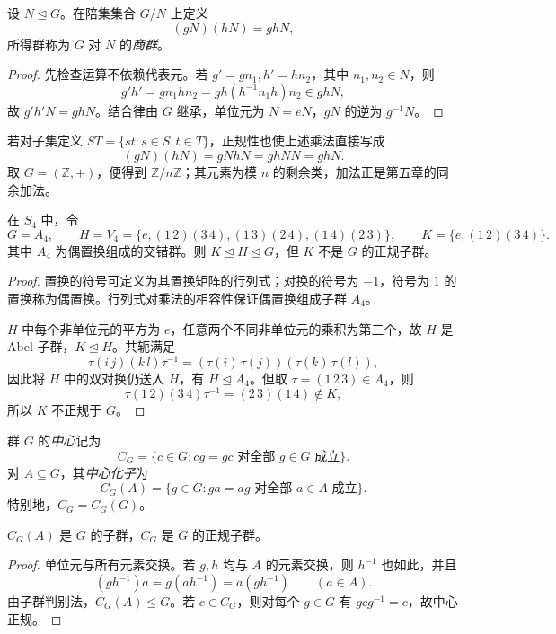 \documentclass[lang=cn,a4paper,fontset=none,zihao=false,10pt,openany,twoside]{beautybook}
\numberwithin{algorithm}{chapter}
\begin{document}
\begin{definition}[商群]
设 $N\trianglelefteq G$。在陪集集合 $G/N$ 上定义
\[
 (gN)(hN)=ghN,
\]
所得群称为 $G$ 对 $N$ 的\emph{商群}。
\end{definition}
\begin{proof}
先检查运算不依赖代表元。若 $g'=gn_1,h'=hn_2$，其中 $n_1,n_2\in N$，则
\[
 g'h'=gn_1hn_2=gh(h^{-1}n_1h)n_2\in ghN,
\]
故 $g'h'N=ghN$。结合律由 $G$ 继承，单位元为 $N=eN$，$gN$ 的逆为 $g^{-1}N$。
\end{proof}
若对子集定义 $ST=\{st:s\in S,t\in T\}$，正规性也使上述乘法直接写成
\[
 (gN)(hN)=gNhN=ghNN=ghN.
\]
取 $G=(\mathbb Z,+)$，便得到 $\mathbb Z/n\mathbb Z$；其元素为模 $n$ 的剩余类，加法正是第五章的同余加法。

\begin{example}[正规性没有传递性]
在 $S_4$ 中，令
\[
 G=A_4,\qquad
 H=V_4=\{e,(1\,2)(3\,4),(1\,3)(2\,4),(1\,4)(2\,3)\},
 \qquad K=\{e,(1\,2)(3\,4)\}.
\]
其中 $A_4$ 为偶置换组成的交错群。则 $K\trianglelefteq H\trianglelefteq G$，但 $K$ 不是 $G$ 的正规子群。
\end{example}
\begin{proof}
置换的符号可定义为其置换矩阵的行列式；对换的符号为 $-1$，符号为 $1$ 的置换称为偶置换。行列式对乘法的相容性保证偶置换组成子群 $A_4$。

$H$ 中每个非单位元的平方为 $e$，任意两个不同非单位元的乘积为第三个，故 $H$ 是 Abel 子群，$K\trianglelefteq H$。共轭满足
\[
 \tau(i\,j)(k\,l)\tau^{-1}
 =(\tau(i)\,\tau(j))(\tau(k)\,\tau(l)),
\]
因此将 $H$ 中的双对换仍送入 $H$，有 $H\trianglelefteq A_4$。但取 $\tau=(1\,2\,3)\in A_4$，则
\[
 \tau(1\,2)(3\,4)\tau^{-1}=(2\,3)(1\,4)\notin K,
\]
所以 $K$ 不正规于 $G$。
\end{proof}

\begin{definition}[中心与中心化子]
群 $G$ 的\emph{中心}记为
\[
 C_G=\{c\in G:cg=gc\text{ 对全部 }g\in G\text{ 成立}\}.
\]
对 $A\subseteq G$，其\emph{中心化子}为
\[
 C_G(A)=\{g\in G:ga=ag\text{ 对全部 }a\in A\text{ 成立}\}.
\]
特别地，$C_G=C_G(G)$。
\end{definition}
\begin{proposition}
$C_G(A)$ 是 $G$ 的子群，$C_G$ 是 $G$ 的正规子群。
\end{proposition}
\begin{proof}
单位元与所有元素交换。若 $g,h$ 均与 $A$ 的元素交换，则 $h^{-1}$ 也如此，并且
\[
 (gh^{-1})a=g(ah^{-1})=a(gh^{-1})\qquad(a\in A).
\]
由子群判别法，$C_G(A)\le G$。若 $c\in C_G$，则对每个 $g\in G$ 有 $gcg^{-1}=c$，故中心正规。
\end{proof}
\end{document}
